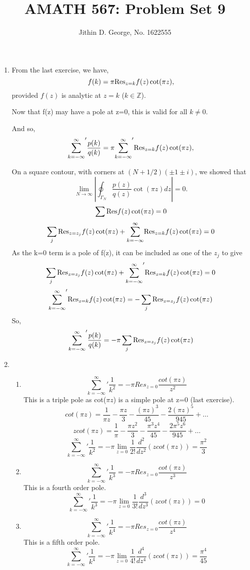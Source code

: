 \documentclass[a4paper]{article}
\title{AMATH 567: Problem Set 9}
\author{Jithin D. George, No. 1622555}
\begin{document}
\maketitle
\begin{enumerate}
	
	\item
	
From the last exercise, we have, 	
	\[
f(k)= \pi	{\rm Res}_{z=k}f(z)\cot(\pi z),
	\]
	provided $f(z)$ is analytic at $z=k$ ($k \in \mathbb{Z}$).
	
Now that f(z) may have a pole at z=0, this is valid for all $k \neq 0$.

And so,
\[
{\sum_{k=-\infty}^\infty}' \frac{p(k)}{q(k)}=\pi {\sum_{k=-\infty}^\infty}' {\rm
	Res}_{z=k}f(z)\cot(\pi z),
\]

On a square contour, with corners at $(N+1/2)(\pm 1\pm
i)$, we showed that
\[
\lim_{N\rightarrow \infty}
\left|\oint_{\Gamma_N}\frac{p(z)}{q(z)}\cot(\pi z)dz\right|=0.
\]
\[\sum {\rm
	Res} f(z)\cot(\pi z) =0\]
\[\sum_j {\rm
	Res}_{z=z_j}f(z)\cot(\pi z)+{\sum_{k=-\infty}^\infty} {\rm
	Res}_{z=k}f(z)\cot(\pi z)=0\]
As the k=0 term is a pole of f(z), it can be included as one of the $z_j$ to give
\[\sum_j {\rm
	Res}_{z=z_j}f(z)\cot(\pi z)+{\sum_{k=-\infty}^\infty}' {\rm
	Res}_{z=k}f(z)\cot(\pi z)=0\]
\[{\sum_{k=-\infty}^\infty}' {\rm
	Res}_{z=k}f(z)\cot(\pi z)=-\sum_j {\rm
	Res}_{z=z_j}f(z)\cot(\pi z)\]
So, 
\[{\sum_{k=-\infty}^\infty}' \frac{p(k)}{q(k)}=-\pi \sum_j {\rm
		Res}_{z=z_j}f(z)\cot(\pi z)\]
\item 
\begin{enumerate}
	\item
	\[ {\sum_{k=-\infty}^\infty}' \frac{1}{k^2}= -\pi Res_{z=0} \frac{cot(\pi z)}{z^2}\]
	This is a triple pole as cot($\pi z$) is a simple pole at z=0 (last exercise).  
		\[ cot (\pi z) = \frac{1}{\pi z} - \frac{\pi z}{3} - \frac{(\pi z)^3}{45}-\frac{2(\pi z)^5}{945}+\ldots\]
				\[z cot (\pi z) = \frac{1}{\pi } - \frac{\pi z^2}{3} - \frac{\pi^3 z^4}{45}-\frac{2\pi^5 z^6}{945}+\ldots\]
		\[ {\sum_{k=-\infty}^\infty}' \frac{1}{k^2}= -\pi \lim_{z=0}\frac{1}{2!} \frac{d^2 }{dz^2} \left( zcot(\pi z) \right) = \frac{\pi^2}{3}\]
	\item
		\[ {\sum_{k=-\infty}^\infty}' \frac{1}{k^3}= -\pi Res_{z=0} \frac{cot(\pi z)}{z^3}\]
		This is a fourth order pole.
				\[ {\sum_{k=-\infty}^\infty}' \frac{1}{k^3}= -\pi \lim_{z=0} \frac{1}{3!} \frac{d^3 }{dz^3} \left( zcot(\pi z) \right) = 0\]
	\item
			\[ {\sum_{k=-\infty}^\infty}' \frac{1}{k^4}= -\pi Res_{z=0} \frac{cot(\pi z)}{z^4}\]
			This is a fifth order pole.
					\[ {\sum_{k=-\infty}^\infty}' \frac{1}{k^4}= -\pi \lim_{z=0} \frac{1}{4!} \frac{d^4 }{dz^4} \left( zcot(\pi z) \right) = \frac{\pi^4}{45}\]
\end{enumerate}


\end{enumerate}
\end{document}
